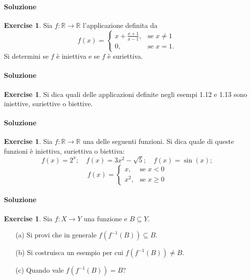\documentclass{article}
\theoremstyle{plain}
\theoremstyle{definition}
\newtheorem{xca}[exmp]{Exercise}
\theoremstyle{remark}
\begin{document}
\paragraph{Soluzione}

\begin{bxthm}
\begin{xca}
Sia $f : \mathbb{R} \to \mathbb{R}$ l'applicazione definita da
\[
f(x) = 
\begin{cases}
x + \frac{x+1}{x-1}, & \text{se } x \neq 1\\[1.2ex]
0, & \text{se } x = 1.
\end{cases}
\]
Si determini se $f$ è iniettiva e se $f$ è suriettiva.
\end{xca}
\end{bxthm}
\paragraph{Soluzione}

\begin{bxthm}
\begin{xca}
Si dica quali delle applicazioni definite negli esempi 1.12 e 1.13 sono 
iniettive, suriettive o biettive.
\end{xca}
\end{bxthm}
\paragraph{Soluzione}

\begin{bxthm}
\begin{xca}
Sia $f : \mathbb{R} \to \mathbb{R}$ una delle seguenti funzioni. Si dica quale di queste 
funzioni è iniettiva, suriettiva o biettiva:
\[
f(x) = 2^x; \quad f(x) = 3x^2 - \sqrt{5}; \quad f(x) = \sin(x);
\]
\[
f(x) = 
\begin{cases}
x, & \text{se } x < 0\\[1.2ex]
x^2, & \text{se } x \ge 0
\end{cases}
\]
\end{xca}
\end{bxthm}
\paragraph{Soluzione}

\begin{bxthm}
\begin{xca}
Sia $f : X \longrightarrow Y$ una funzione e $B \subseteq Y$.
\begin{itemize}
    \item[(a)] Si provi che in generale $f(f^{-1}(B)) \subseteq B$.
    \item[(b)] Si costruisca un esempio per cui $f(f^{-1}(B)) \neq B$.
    \item[(c)] Quando vale $f(f^{-1}(B)) = B$?
\end{itemize}
\end{xca}
\end{bxthm}
\end{document}
